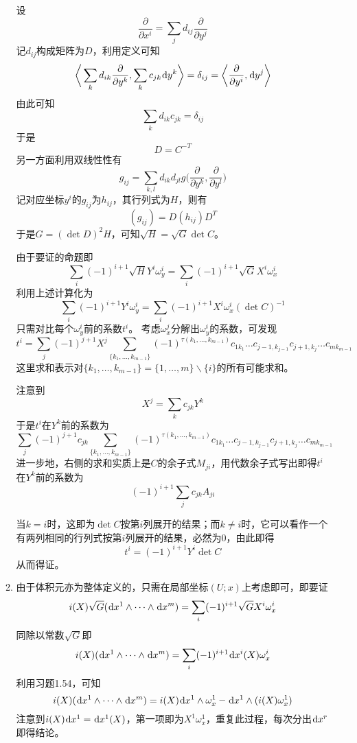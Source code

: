 \documentclass[a4paper,UTF8,fontset=windows,10pt]{ctexart}
\newcommand*{\dr}{\hspace{0.07em}\mathrm{d}}
\begin{document}
\begin{enumerate}
\begin{enumerate}[(1)]
        设
        $$\frac{\partial}{\partial x^i}=\sum_jd_{ij}\frac{\partial}{\partial y^j}$$
        记$d_{ij}$构成矩阵为$D$，利用定义可知
        $$\bigg\langle\sum_kd_{ik}\frac{\partial}{\partial y^k},\sum_kc_{jk}\dr y^k\bigg\rangle=\delta_{ij}=\bigg\langle\frac{\partial}{\partial y^i},\dr y^j\bigg\rangle$$
        由此可知
        $$\sum_kd_{ik}c_{jk}=\delta_{ij}$$
        于是
        $$D=C^{-T}$$
        另一方面利用双线性性有
        $$g_{ij}=\sum_{k,l}d_{ik}d_{jl}g\bigg(\frac{\partial}{\partial y^k},\frac{\partial}{\partial y^l}\bigg)$$
        记对应坐标$y^i$的$g_{ij}$为$h_{ij}$，其行列式为$H$，则有
        $$(g_{ij})=D(h_{ij})D^T$$
        于是$G=(\det D)^2H$，可知$\sqrt{H}=\sqrt{G}\det C$。
        
        由于要证的命题即
        $$\sum_i(-1)^{i+1}\sqrt{H}Y^i\omega_y^i=\sum_i(-1)^{i+1}\sqrt{G}X^i\omega_x^i$$
        利用上述计算化为
        $$\sum_i(-1)^{i+1}Y^i\omega_y^i=\sum_i(-1)^{i+1}X^i\omega_x^i(\det C)^{-1}$$
        只需对比每个$\omega_y^i$前的系数$t^i$。
        考虑$\omega_x^j$分解出$\omega_y^i$的系数，可发现
        $$t^i=\sum_j(-1)^{j+1}X^j\sum_{\{k_1,\dots,k_{m-1}\}}(-1)^{\tau(k_1,\dots,k_{m-1})}c_{1k_1}\dots c_{j-1,k_{j-1}}c_{j+1,k_j}\dots c_{mk_{m-1}}$$
        这里求和表示对$\{k_1,\dots,k_{m-1}\}=\{1,\dots,m\}\backslash\{i\}$的所有可能求和。
    
        注意到
        $$X^j=\sum_kc_{jk}Y^k$$
        于是$t^i$在$Y^k$前的系数为
        $$\sum_j(-1)^{j+1}c_{jk}\sum_{\{k_1,\dots,k_{m-1}\}}(-1)^{\tau(k_1,\dots,k_{m-1})}c_{1k_1}\dots c_{j-1,k_{j-1}}c_{j+1,k_j}\dots c_{mk_{m-1}}$$
        进一步地，右侧的求和实质上是$C$的余子式$M_{ji}$，用代数余子式写出即得$t^i$在$Y^k$前的系数为
        $$(-1)^{i+1}\sum_jc_{jk}A_{ji}$$
    
        当$k=i$时，这即为$\det C$按第$i$列展开的结果；而$k\ne i$时，它可以看作一个有两列相同的行列式按第$i$列展开的结果，必然为0，由此即得
        $$t^i=(-1)^{i+1}Y^i\det C$$
        从而得证。
        
        \item 由于体积元亦为整体定义的，只需在局部坐标$(U;x)$上考虑即可，即要证
        $$i(X)\sqrt{G}(\dr x^1\wedge\cdots\wedge\dr x^m)=\sum_i(-1)^{i+1}\sqrt{G}X^i\omega_x^i$$
        同除以常数$\sqrt{G}$即
        $$i(X)(\dr x^1\wedge\cdots\wedge\dr x^m)=\sum_i(-1)^{i+1}\dr x^i(X)\omega_x^i$$
        利用习题1.54，可知
        $$i(X)(\dr x^1\wedge\cdots\wedge\dr x^m)=i(X)\dr x^1\wedge\omega_x^1-\dr x^1\wedge(i(X)\omega_x^1)$$
        注意到$i(X)\dr x^1=\dr x^1(X)$，第一项即为$X^1\omega_x^1$，重复此过程，每次分出$\dr x^r$即得结论。
    \end{enumerate}
    

\end{enumerate}
\end{document}
